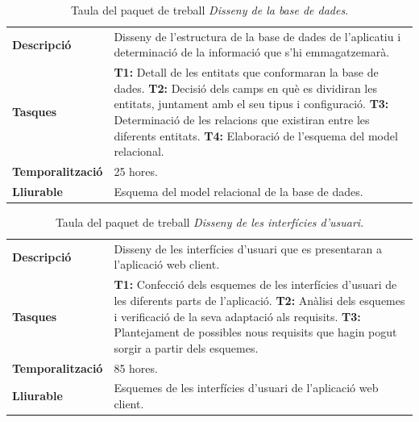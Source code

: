 \documentclass[a4paper,12pt]{ThesisStyle}
\begin{document}
\begin{table}[H]
  \begin{tabularx}{\textwidth}{l | X}
    \toprule
    \rowcolor{Green}
    \multicolumn{2}{c}{\textbf{PT\_2.2:} Disseny de la base de dades}\\
    \midrule[0.9pt]
    \textbf{Descripció}       & Disseny de l'estructura de la base de dades de l'aplicatiu i determinació de la informació que s'hi emmagatzemarà.\\
    \midrule
    \textbf{Tasques}          & \textbf{T1:} Detall de les entitats que conformaran la base de dades.
    \newline \textbf{T2:} Decisió dels camps en què es dividiran les entitats, juntament amb el seu tipus i configuració.
    \newline \textbf{T3:} Determinació de les relacions que existiran entre les diferents entitats.
    \newline \textbf{T4:} Elaboració de l'esquema del model relacional.\\
    \midrule
    \textbf{Temporalització}  & 25 hores.\\
    \midrule
    \textbf{Lliurable}        & Esquema del model relacional de la base de dades.\\
    \bottomrule
  \end{tabularx}
  \caption{\label{taula:pt_2.2} Taula del paquet de treball \emph{Disseny de la base de dades}.}
\end{table}

\begin{table}[H]
  \begin{tabularx}{\textwidth}{l | X}
    \toprule
    \rowcolor{Green}
    \multicolumn{2}{c}{\textbf{PT\_2.3:} Disseny de les interfícies d'usuari}\\
    \midrule[0.9pt]
    \textbf{Descripció}       & Disseny de les interfícies d'usuari que es presentaran a l'aplicació web client.\\
    \midrule
    \textbf{Tasques}          & \textbf{T1:} Confecció dels esquemes de les interfícies d'usuari de les diferents parts de l'aplicació.
    \newline \textbf{T2:} Anàlisi dels esquemes i verificació de la seva adaptació als requisits.
    \newline \textbf{T3:} Plantejament de possibles nous requisits que hagin pogut sorgir a partir dels esquemes.\\
    \midrule
    \textbf{Temporalització}  & 85 hores.\\
    \midrule
    \textbf{Lliurable}        & Esquemes de les interfícies d'usuari de l'aplicació web client.\\
    \bottomrule
  \end{tabularx}
  \caption{\label{taula:pt_2.3} Taula del paquet de treball \emph{Disseny de les interfícies d'usuari}.}
\end{table}
\end{document}
